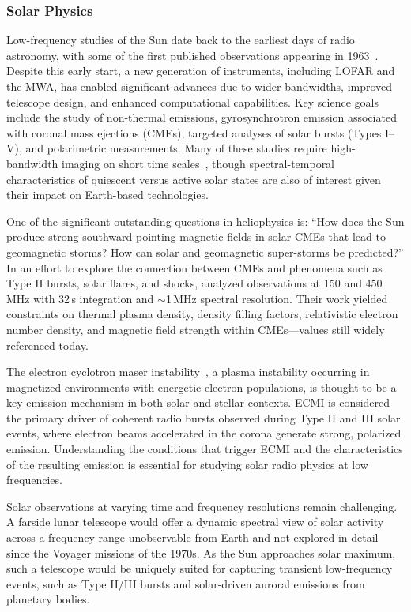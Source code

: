 \subsubsection{Solar Physics}
Low-frequency studies of the Sun date back to the earliest days of radio astronomy, with some of the first published observations appearing in 1963~\citep{Wild_1963}. Despite this early start, a new generation of instruments, including LOFAR and the MWA, has enabled significant advances due to wider bandwidths, improved telescope design, and enhanced computational capabilities. Key science goals include the study of non-thermal emissions, gyrosynchrotron emission associated with coronal mass ejections (CMEs), targeted analyses of solar bursts (Types I--V), and polarimetric measurements. Many of these studies require high-bandwidth imaging on short time scales~\citep{Kansabanik_2022}, though spectral-temporal characteristics of quiescent versus active solar states are also of interest given their impact on Earth-based technologies.

One of the significant outstanding questions in heliophysics is: ``How does the Sun produce strong southward-pointing magnetic fields in solar CMEs that lead to geomagnetic storms? How can solar and geomagnetic super-storms be predicted?'' In an effort to explore the connection between CMEs and phenomena such as Type II bursts, solar flares, and shocks, \citet{Bastian_2001} analyzed observations at 150 and 450\,MHz with 32\,s integration and $\sim$1\,MHz spectral resolution. Their work yielded constraints on thermal plasma density, density filling factors, relativistic electron number density, and magnetic field strength within CMEs—values still widely referenced today.

The electron cyclotron maser instability~\citep[ECMI;][]{EMI}, a plasma instability occurring in magnetized environments with energetic electron populations, is thought to be a key emission mechanism in both solar and stellar contexts. ECMI is considered the primary driver of coherent radio bursts observed during Type II and III solar events, where electron beams accelerated in the corona generate strong, polarized emission. Understanding the conditions that trigger ECMI and the characteristics of the resulting emission is essential for studying solar radio physics at low frequencies.

Solar observations at varying time and frequency resolutions remain challenging. A farside lunar telescope would offer a dynamic spectral view of solar activity across a frequency range unobservable from Earth and not explored in detail since the Voyager missions of the 1970s. As the Sun approaches solar maximum, such a telescope would be uniquely suited for capturing transient low-frequency events, such as Type II/III bursts and solar-driven auroral emissions from planetary bodies. 

